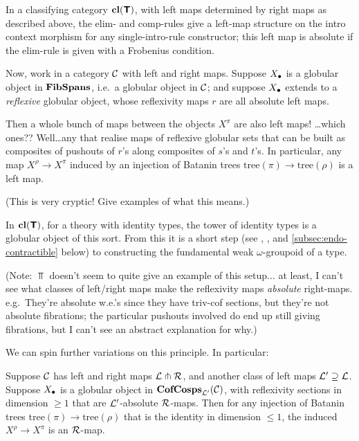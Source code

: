 \documentclass{amsart}
\newcommand{\tr}{\mathrm{tree}}
\begin{document}
\begin{example}In a classifying category $\mathbf{cl}(\textbf{\textsf{T}})$, with left maps determined by right maps as described above, the elim- and comp-rules give a left-map structure on the intro context morphism for any single-intro-rule constructor; this left map is absolute if the elim-rule is given with a Frobenius condition.
\end{example}

Now, work in a category $\mathcal{C}$ with left and right maps.  Suppose $X_\bullet$ is a globular object in $\mathbf{FibSpans}$, i.e.\ a globular object in $\mathcal{C}$; and suppose $X_\bullet$ extends to a \emph{reflexive} globular object, whose reflexivity maps $r$ are all absolute left maps.

Then a whole bunch of maps between the objects $X^\pi$ are also left maps!  \ldots which ones??  Well\ldots any that realise maps of reflexive globular sets that can be built as composites of pushouts of $r$'s along composites of $s$'s and $t$'s.  In particular, any map $X^\rho \to X^\pi$ induced by an injection of Batanin trees $\tr(\pi) \to \tr(\rho)$ is a left map.

(This is very cryptic!  Give examples of what this means.)

\begin{example}
In $\mathbf{cl}(\textbf{\textsf{T}})$, for a theory with identity types, the tower of identity types is a globular object of this sort.  From this it is a short step (see \cite{lumsdaine:tlca-journal}, \cite{garner-van-den-berg}, and \ref{subsec:endo-contractible} below) to constructing the fundamental weak $\omega$-groupoid of a type.
\end{example}

(Note: $\Top$ doesn't seem to quite give an example of this setup$\ldots$ at least, I can't see what classes of left/right maps make the reflexivity maps \emph{absolute} right-maps.  e.g.\ They're absolute w.e.'s since they have triv-cof sections, but they're not absolute fibrations; the particular pushouts involved do end up still giving fibrations, but I can't see an abstract explanation for why.)

We can spin further variations on this principle.  In particular:

\begin{proposition}
Suppose $\mathcal{C}$ has left and right maps $\mathcal{L} \pitchfork \mathcal{R}$, and another class of left maps $\mathcal{L}' \supseteq \mathcal{L}$.  Suppose $X_\bullet$ is a globular object in $\mathbf{CofCosps}_{\mathcal{L}'}(\mathcal{C})$, with reflexivity sections in dimension $\geq 1$ that are $\mathcal{L}'$-absolute $\mathcal{R}$-maps.  Then for any injection of Batanin trees $\tr(\pi) \to \tr(\rho)$ that is the identity in dimension $\leq 1$, the induced $X^\rho \to X^\pi$ is an $\mathcal{R}$-map.
\end{proposition}
\end{document}
